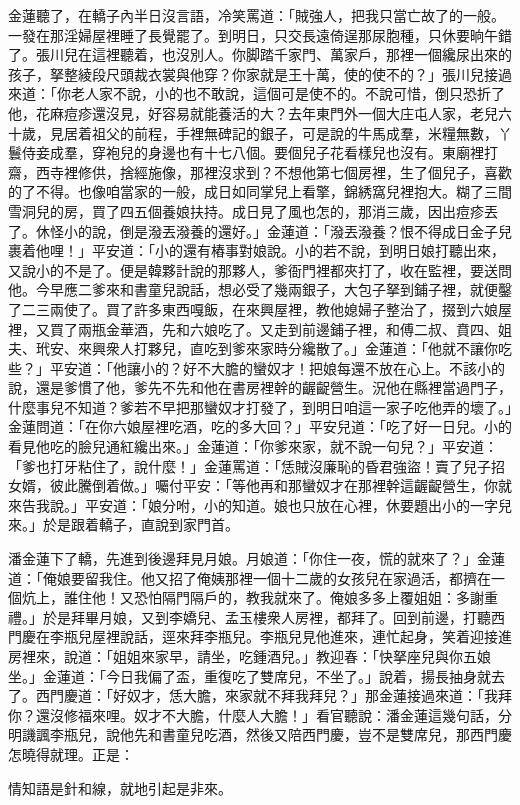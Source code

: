 金蓮聽了，在轎子內半日沒言語，冷笑罵道：「賊強人，把我只當亡故了的一般。一發在那淫婦屋裡睡了長覺罷了。到明日，只交長遠倚逞那尿胞種，只休要晌午錯了。張川兒在這裡聽着，也沒別人。你脚踏千家門、萬家戶，那裡一個纔尿出來的孩子，拏整綾段尺頭裁衣裳與他穿？你家就是王十萬，使的使不的？」張川兒接過來道：「你老人家不說，小的也不敢說，這個可是使不的。不說可惜，倒只恐折了他，{}花麻痘疹還沒見，好容易就能養活的大？去年東門外一個大庄屯人家，老兒六十歲，見居着祖父的前程，手裡無碑記的銀子，可是說的牛馬成羣，米糧無數，丫鬟侍妾成羣，穿袍兒的身邊也有十七八個。要個兒子花看樣兒也沒有。東廟裡打齋，西寺裡修供，捨經施像，那裡沒求到？不想他第七個房裡，生了個兒子，喜歡的了不得。也像咱當家的一般，成日如同掌兒上看擎，錦綉窩兒裡抱大。糊了三間雪洞兒的房，買了四五個養娘扶持。成日見了風也怎的，那消三歲，因出痘疹丟了。休怪小的說，倒是潑丟潑養的還好。」金蓮道：「潑丟潑養？恨不得成日金子兒裹着他哩！」平安道：「小的還有樁事對娘說。小的若不說，到明日娘打聽出來，又說小的不是了。便是韓夥計說的那夥人，爹衙門裡都夾打了，收在監裡，要送問他。今早應二爹來和書童兒說話，想必受了幾兩銀子，大包子拏到鋪子裡，就便鑿了二三兩使了。買了許多東西嘎飯，在來興屋裡，教他媳婦子整治了，掇到六娘屋裡，又買了兩瓶金華酒，先和六娘吃了。又走到前邊鋪子裡，和傅二叔、賁四、姐夫、玳安、來興衆人打夥兒，直吃到爹來家時分纔散了。」金蓮道：「他就不讓你吃些？」平安道：「他讓小的？好不大膽的蠻奴才！把娘每還不放在心上。不該小的說，還是爹慣了他，爹先不先和他在書房裡幹的齷齪營生。{}況他在縣裡當過門子，什麼事兒不知道？爹若不早把那蠻奴才打發了，到明日咱這一家子吃他弄的壞了。」金蓮問道：「在你六娘屋裡吃酒，吃的多大回？」平安兒道：「吃了好一日兒。小的看見他吃的臉兒通紅纔出來。」金蓮道：「你爹來家，就不說一句兒？」平安道：「爹也打牙粘住了，說什麼！」金蓮罵道：「恁賊沒廉恥的昏君強盜！賣了兒子招女婿，彼此騰倒着做。」{}囑付平安：「等他再和那蠻奴才在那裡幹這齷齪營生，你就來告我說。」平安道：「娘分咐，小的知道。娘也只放在心裡，休要題出小的一字兒來。」於是跟着轎子，直說到家門首。

潘金蓮下了轎，先進到後邊拜見月娘。月娘道：「你住一夜，慌的就來了？」金蓮道：「俺娘要留我住。他又招了俺姨那裡一個十二歲的女孩兒在家過活，都擠在一個炕上，誰住他！又恐怕隔門隔戶的，教我就來了。俺娘多多上覆姐姐：多謝重禮。」於是拜畢月娘，又到李嬌兒、孟玉樓衆人房裡，都拜了。回到前邊，打聽西門慶在李瓶兒屋裡說話，逕來拜李瓶兒。李瓶兒見他進來，連忙起身，笑着迎接進房裡來，說道：「姐姐來家早，請坐，吃鍾酒兒。」教迎春：「快拏座兒與你五娘坐。」金蓮道：「今日我偏了盃，重復吃了雙席兒，不坐了。」說着，揚長抽身就去了。西門慶道：「好奴才，恁大膽，來家就不拜我拜兒？」那金蓮接過來道：「我拜你？還沒修福來哩。奴才不大膽，什麼人大膽！」看官聽說：潘金蓮這幾句話，分明譏諷李瓶兒，說他先和書童兒吃酒，然後又陪西門慶，豈不是雙席兒，那西門慶怎曉得就理。正是：

\begin{myquote} 
情知語是針和線，就地引起是非來。
\end{myquote} 

